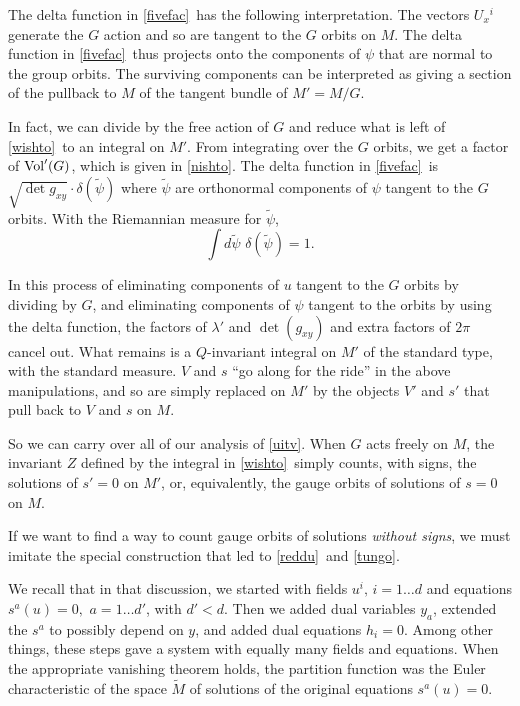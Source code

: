\documentclass[12pt]{article}
\numberwithin{equation}{section}
\def\tilde{\widetilde}
\begin{document}
The delta function in \eqref{fivefac}\ has the following interpretation.
The vectors $U_x{}^i$ generate the $G$ action and so are tangent to the
$G$ orbits on $M$.  The delta function in \eqref{fivefac}\ thus projects
onto the components of $\psi$ that are normal to the group orbits.
The surviving components can be interpreted as giving a section of the
pullback to $M$ of the tangent bundle of $M'=M/G$.

In fact, we can divide by the free action of $G$ and reduce what is left
of \eqref{wishto}\ to an integral on $M'$.
{}From integrating over the $G$ orbits, we get a factor of ${\rm Vol}'(G)$,
which is given in \eqref{nishto}.
The delta
function in \eqref{fivefac}\ is $\sqrt{\det {g_{xy}}}\cdot \delta(\tilde\psi)$
where $\tilde\psi$ are orthonormal components of $\psi$ tangent to the
$G$ orbits.   With the Riemannian measure for $\tilde\psi$,
\begin{equation}
  \int d\tilde\psi\,\,\delta(\tilde\psi)=1.
\end{equation}

In this process of eliminating components of $u$ tangent to the $G$ orbits
by dividing by $G$, and eliminating components of $\psi$ tangent
to the orbits by using the delta function, the factors of $\lambda'$
and $\det (g_{xy})$ and extra factors of $2\pi$ cancel out.
What remains is a $Q$-invariant integral on $M'$ of the standard
type, with the standard measure.  $V$ and $s$ ``go along
for the ride'' in the above manipulations, and so are simply
replaced on $M'$ by the objects
$V'$ and $s'$ that pull back to $V$ and $s$ on $M$.

So we can carry over all of our analysis of \eqref{uitv}.  When $G$ acts
freely on $M$, the invariant $Z$ defined by the integral in
\eqref{wishto}\ simply counts, with signs, the solutions of $s'=0$ on $M'$,
or, equivalently, the gauge orbits of solutions of $s=0 $ on $M$.

\bigskip
{}

If we want to find a way to count gauge orbits of solutions
{\it without signs}, we must imitate the special construction that led
to \eqref{reddu}\ and \eqref{tungo}.

We recall that in that discussion, we started with fields $u^i,\,i=1\dots d$
and
equations $s^a(u)=0,\,\,a=1\dots d'$, with $d'<d$.
Then we added dual variables $y_a$, extended the $s^a$ to possibly
depend on $y$,  and added dual equations
$h_i=0$.
Among other things, these steps gave a system with equally many fields
and equations.  When the appropriate vanishing theorem holds,
the partition function was the Euler characteristic
of the space $\tilde M$ of solutions of the original equations $s^a(u)=0$.
\end{document}
